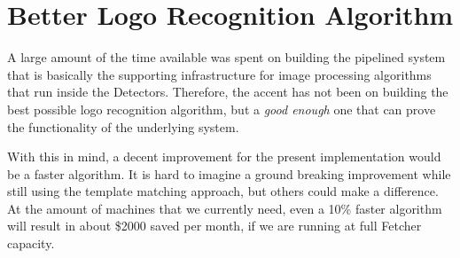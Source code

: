 \section{Better Logo Recognition Algorithm}

A large amount of the time available was spent on building the pipelined
system that is basically the supporting infrastructure for image processing
algorithms that run inside the Detectors. Therefore, the accent has not been
on building the best possible logo recognition algorithm, but a
\textit{good enough} one that can prove the functionality of the underlying
system.

With this in mind, a decent improvement for the present implementation would
be a faster algorithm. It is hard to imagine a ground breaking improvement
while still using the template matching approach, but others could make a
difference. At the amount of machines that we currently need, even a 10\%
faster algorithm will result in about \$2000 saved per month, if we are
running at full Fetcher capacity.

